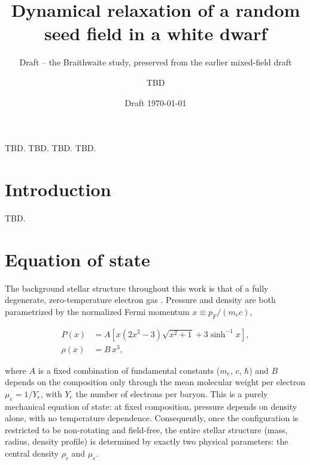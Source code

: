 \documentclass{aa}
\begin{document}
   \title{Dynamical relaxation of a random seed field in a white dwarf}

   \subtitle{Draft -- the Braithwaite study, preserved from the earlier
   mixed-field draft}

   \author{TBD
          }


   \date{Draft \today}

   \abstract
   {TBD.}
   {TBD.}
   {TBD.}
   {TBD.}
   {}


   \maketitle


\section{Introduction}

TBD.


\section{Equation of state}
\label{sec:eos}

The background stellar structure throughout this work is that of a
fully degenerate, zero-temperature electron gas
\citep[ztwd;][]{chandrasekhar1935}. Pressure and density are both
parametrized by the normalized Fermi momentum $x \equiv p_F/(m_e c)$,

\begin{align}
P(x) &= A \left[ x(2x^2-3)\sqrt{x^2+1} + 3\sinh^{-1}x \right],
\label{eq:pressure} \\
\rho(x) &= B\,x^3,
\label{eq:density}
\end{align}

\noindent where $A$ is a fixed combination of fundamental constants
($m_e$, $c$, $\hbar$) and $B$ depends on the composition only through
the mean molecular weight per electron $\mu_e = 1/Y_e$, with $Y_e$ the
number of electrons per baryon. This is a purely mechanical equation of
state: at fixed composition, pressure depends on density alone, with no
temperature dependence. Consequently, once the configuration is
restricted to be non-rotating and field-free, the entire stellar
structure (mass, radius, density profile) is determined by exactly two
physical parameters: the central density $\rho_c$ and $\mu_e$.
\end{document}
